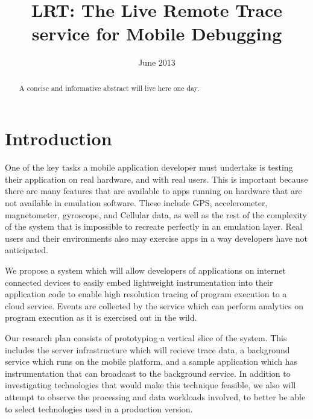 \documentclass{acm_proc_article-sp}
\begin{document}
\title{LRT: The Live Remote Trace service for Mobile Debugging}
\date{June 2013}

\maketitle

\begin{abstract}
A concise and informative abstract will live here one day.
\end{abstract}

\section{Introduction}
One of the key tasks a mobile application developer must undertake is testing 
their application on real hardware, and with real users. This is important 
because there are many features that are available to apps running on hardware 
that are not available in emulation software. These include GPS, accelerometer, 
magnetometer, gyroscope, and Cellular data, as well as the rest of the 
complexity of the system that is impossible to recreate perfectly in an 
emulation layer. Real users and their environments also may exercise apps in
a way developers have not anticipated. 

We propose a system which will allow developers of applications on internet connected 
devices to easily embed lightweight instrumentation 
into their application code to enable high resolution 
tracing of program execution to a cloud service. Events are collected by 
the service which can perform analytics on program execution as it is 
exercised out in the wild.

Our research plan consists of prototyping a vertical slice of the system.
This includes the server infrastructure which will recieve trace data,
a background service which runs on the mobile platform, and a sample
application which has instrumentation that can broadcast to the background service.
In addition to investigating technologies that would make this technique 
feasible, we also will attempt to observe the processing and data workloads
involved, to better be able to select technologies used in a production version.
\end{document}
